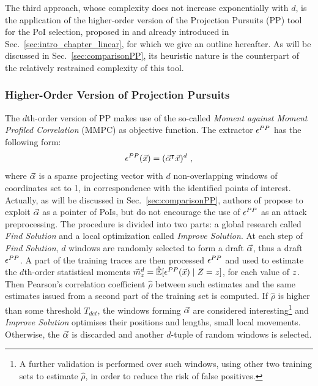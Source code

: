 The third approach, whose complexity does not increase exponentially with $d$, is the application of the higher-order version of the Projection Pursuits (PP) tool for the PoI selection, proposed in \cite{PP} and already introduced in Sec.~\ref{sec:intro_chapter_linear}, for which we give an outline hereafter. As will be discussed in Sec.~\ref{sec:comparisonPP}, its heuristic nature is the counterpart of the relatively restrained complexity of this tool. \\

%

\subsubsection{Higher-Order Version of Projection Pursuits}\label{sec:PP_description}
The $d$th-order version of PP makes use of the so-called \emph{Moment against Moment Profiled Correlation} (MMPC) as objective function. The extractor $\epsilon^{PP}$ has the following form:
\begin{equation} 
\epsilon^{PP}(\vec{x}) = (\vec{\alpha}^\intercal \vec{x})^d \mbox{ ,}
\end{equation}
where $\vec{\alpha}$ is a sparse projecting vector with $d$ non-overlapping windows of coordinates set to 1, in correspondence with the identified points of interest. Actually, as will be discussed in Sec.~\ref{sec:comparisonPP}, authors of \cite{PP} propose to exploit $\vec{\alpha}$ as a pointer of PoIs, but do not encourage the use of $\epsilon^{PP}$ as an attack preprocessing. The procedure is divided into two parts: a global research called {\em Find Solution} and a local optimization called {\em Improve Solution}. At each step of {\em Find Solution}, $d$ windows are randomly selected to form a draft $\vec{\alpha}$, thus a draft $\epsilon^{PP}$. A part of the training traces are then processed \via $\epsilon^{PP}$ and used to estimate the $d$th-order statistical moments $\mmm^d_\sensVar = \esperEst[\given{\extract^{PP}(\vLeakVec)}{\sensRandVar=\sensVar}]$,  for each value of $z$. Then Pearson's correlation coefficient $\hat{\rho}$ between such estimates and the same estimates issued from a second part of the training set is computed. If $\hat{\rho}$ is higher than some threshold $T_{det}$, the windows forming $\vec{\alpha}$ are considered interesting\footnote{A further validation is performed over such windows, using other two training sets to estimate $\hat{\rho}$, in order to reduce the risk of false positives.}\label{fn:4trainingSets} and \emph{Improve Solution} optimises their positions and lengths, \via small local movements. Otherwise, the $\vec{\alpha}$ is discarded and another $d$-tuple of random windows is selected.\\

